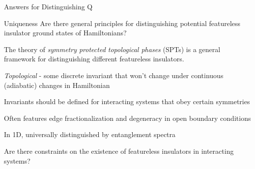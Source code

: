 \begin{frame}{Answers for Distinguishing Q}
\begin{block}{Uniqueness}
Are there general principles for distinguishing potential featureless insulator ground states of Hamiltonians?
\end{block}

The theory of {\em symmetry protected topological phases} (SPTs) is a general framework for distinguishing different featureless insulators.

\bi 
\item {\em Topological} - some discrete invariant that won't change under continuous (adiabatic) changes in Hamiltonian
\item Invariants should be defined for interacting systems that obey certain symmetries 
\item Often features edge fractionalization and degeneracy in open boundary conditions
\item In 1D, universally distinguished by entanglement spectra
\ei

Are there constraints on the existence of featureless insulators in interacting systems?


\end{frame}